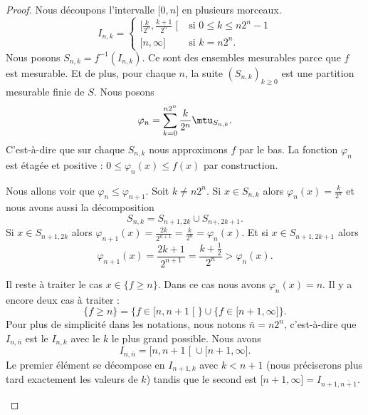 \begin{proof}
	Nous découpons l'intervalle \( \mathopen[ 0 , n \mathclose]\) en plusieurs morceaux.
	\begin{equation}
		I_{n,k}=\begin{cases}
			\mathopen[ \frac{ k }{ 2^n } , \frac{ k+1 }{ 2^n } \mathclose[ & \text{si } 0\leq k\leq n2^n-1 \\
			\mathopen[ n , \infty \mathclose]                              & \text{si } k=n2^n.
		\end{cases}
	\end{equation}
	Nous posons \( S_{n,k}=f^{-1}(I_{n,k})\). Ce sont des ensembles mesurables parce que \( f\) est mesurable. Et de plus, pour chaque \( n\), la suite \( (S_{n,k})_{k\geq 0}\) est une partition mesurable finie de \( S\). Nous posons
	\begin{equation}
		\varphi_n=\sum_{k=0}^{n2^n}\frac{ k }{ 2^n }\mtu_{S_{n,k}}.
	\end{equation}
	C'est-à-dire que sur chaque \( S_{n,k}\) nous approximons \( f\) par le bas. La fonction \( \varphi_n\) est étagée et positive : \( 0\leq \varphi_n(x)\leq f(x)\) par construction.
	\begin{subproof}
		\spitem[Croissance]
		Nous allons voir que \( \varphi_n\leq \varphi_{n+1}\). Soit \( k\neq n2^n\). Si \( x\in S_{n,k}\) alors \( \varphi_n(x)=\frac{ k }{ 2^n }\) et nous avons aussi la décomposition
		\begin{equation}
			S_{n,k}=S_{n+1,2k}\cup S_{n+,2k+1}.
		\end{equation}
		Si \( x\in S_{n+1,2k}\) alors \( \varphi_{n+1}(x)=\frac{ 2k }{ 2^{n+1} }=\frac{ k }{ 2^n }=\varphi_n(x)\). Et si \( x\in S_{n+1,2k+1}\) alors
		\begin{equation}
			\varphi_{n+1}(x)=\frac{ 2k+1 }{ 2^{n+1} }=\frac{ k+\frac{ 1 }{2} }{ 2^n }>\varphi_n(x).
		\end{equation}

		Il reste à traiter le cas \( x\in\{ f\geq n \}\). Dans ce cas nous avons \( \varphi_n(x)=n\). Il y a encore deux cas à traiter :
		\begin{equation}
			\{ f\geq n \}=\{ f\in\mathopen[ n , n+1 \mathclose[ \}\cup\{ f\in\mathopen[ n+1 , \infty \mathclose] \}.
		\end{equation}
		Pour plus de simplicité dans les notations, nous notons \( \bar n=n2^n\), c'est-à-dire que \( I_{n,\bar n}\) est le \( I_{n,k}\) avec le \( k\) le plus grand possible. Nous avons
		\begin{equation}
			I_{n,\bar n}=\mathopen[ n , n+1 \mathclose[\cup\mathopen[ n+1 , \infty \mathclose].
		\end{equation}
		Le premier élément se décompose en \( I_{n+1,k}\) avec \( k<n+1\) (nous préciserons plus tard exactement les valeurs de \( k\)) tandis que le second est \( \mathopen[ n+1 , \infty \mathclose]=I_{n+1,\overline{ n+1 }}\).


\end{subproof}
\end{proof}

